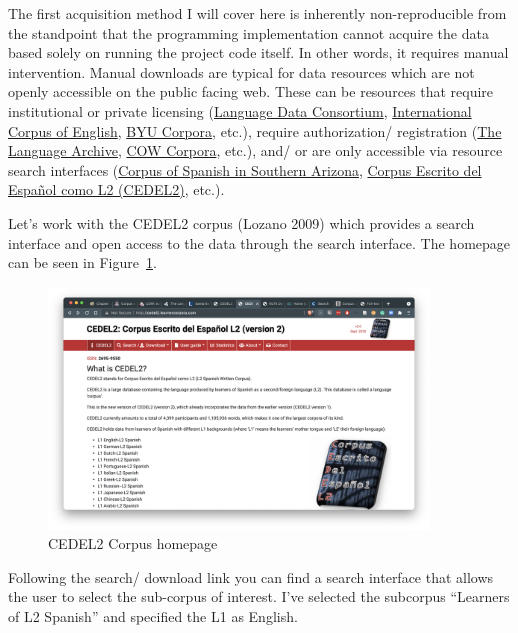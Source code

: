 \documentclass[
  letterpaper,
]{latex/krantz}
\begin{document}
The first acquisition method I will cover here is inherently
non-reproducible from the standpoint that the programming implementation
cannot acquire the data based solely on running the project code itself.
In other words, it requires manual intervention. Manual downloads are
typical for data resources which are not openly accessible on the public
facing web. These can be resources that require institutional or private
licensing (\href{https://www.ldc.upenn.edu/}{Language Data Consortium},
\href{http://ice-corpora.net/ice/}{International Corpus of English},
\href{https://www.corpusdata.org/}{BYU Corpora}, etc.), require
authorization/ registration (\href{https://archive.mpi.nl/tla/}{The
Language Archive}, \href{https://www.webcorpora.org/}{COW Corpora},
etc.), and/ or are only accessible via resource search interfaces
(\href{https://cesa.arizona.edu/}{Corpus of Spanish in Southern
Arizona}, \href{http://cedel2.learnercorpora.com/}{Corpus Escrito del
Español como L2 (CEDEL2)}, etc.).

Let's work with the CEDEL2 corpus (Lozano 2009) which provides a search
interface and open access to the data through the search interface. The
homepage can be seen in Figure~\ref{fig-ad-show-page-cedel2-1}.

\begin{figure}[h]

{\centering \includegraphics[width=0.9\textwidth,height=\textheight]{./figures/acquire-data/ad-cedel2-site.png}

}

\caption{\label{fig-ad-show-page-cedel2-1}CEDEL2 Corpus homepage}

\end{figure}

Following the search/ download link you can find a search interface that
allows the user to select the sub-corpus of interest. I've selected the
subcorpus ``Learners of L2 Spanish'' and specified the L1 as English.
\end{document}
